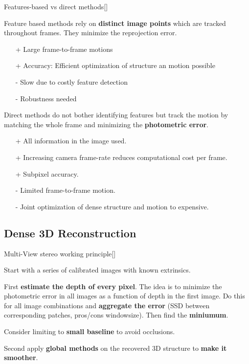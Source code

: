 \documentclass[10pt,a4paper]{scrartcl}
\begin{document}
\begin{multicols*}{2}
\begin{QandA}
{Features-based vs direct methods}[\Comparison]
\item Feature based methods rely on \textbf{distinct image points} which are tracked throughout frames. They minimize the reprojection error. 
\begin{itemize}
\item[+] Large frame-to-frame motions
\item[+] Accuracy: Efficient optimization of structure an motion possible
\item[-] Slow due to costly feature detection
\item[-] Robustness needed
\end{itemize}
\item Direct methods do not bother identifying features but track the motion by matching the whole frame and minimizing the \textbf{photometric error}.
\begin{itemize}
\item[+] All information in the image used.
\item[+] Increasing camera frame-rate reduces computational cost per frame.
\item[+] Subpixel accuracy.
\item[-] Limited frame-to-frame motion.
\item[-] Joint optimization of dense structure and motion to expensive.
\end{itemize}
\end{QandA}

\subsection*{Dense 3D Reconstruction}

\begin{QandA}
{Multi-View stereo working principle}[\Derivation]
\item Start with a series of calibrated images with known extrinsics.
\item First \textbf{estimate the depth of every pixel}. The idea is to minimize the photometric error in all images as a function of depth in the first image. Do this for all image combinations and \textbf{aggregate the error} (SSD between corresponding patches, pros/cons windowsize). Then find the \textbf{miniumum}.
\item Consider limiting to \textbf{small baseline} to avoid occlusions.
\item Second apply \textbf{global methods} on the recovered 3D structure to \textbf{make it smoother}.
\end{QandA}


\end{multicols*}
\end{document}
